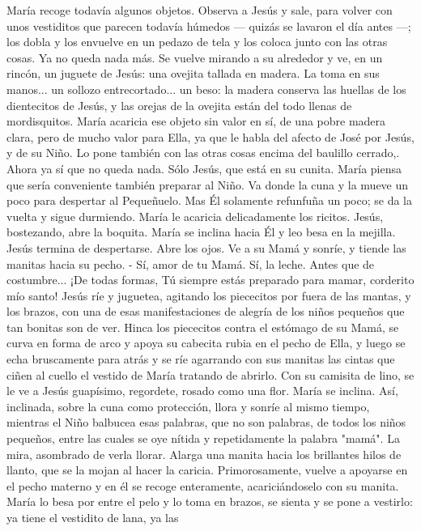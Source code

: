 \documentclass[12pt]{book} %
\begin{document}
María recoge todavía algunos objetos. Observa a Jesús y sale, para volver con unos vestiditos que parecen todavía 
húmedos — quizás se lavaron el día antes —; los dobla y los envuelve en un pedazo de tela y los coloca junto con las otras cosas. Ya no queda nada más. 
Se vuelve mirando a su alrededor y ve, en un rincón, un juguete de Jesús: una ovejita tallada en madera. La toma en sus 
manos... un sollozo entrecortado... un beso: la madera conserva las huellas de los dientecitos de Jesús, y las orejas de la ovejita están del todo llenas de mordisquitos. María acaricia ese objeto sin valor en sí, de una pobre madera clara, pero de mucho valor para Ella, ya que le habla del afecto de José por Jesús, y de su Niño. Lo pone también con las otras cosas encima del baulillo cerrado,.               
Ahora ya sí que no queda nada. Sólo Jesús, que está en su cunita. María piensa que sería conveniente también preparar 
al Niño. Va donde la cuna y la mueve un poco para despertar al Pequeñuelo. Mas Él solamente refunfuña un poco; se da la vuelta y sigue durmiendo. María le acaricia delicadamente los ricitos. Jesús, bostezando, abre la boquita. María se inclina hacia Él y leo besa en la mejilla. Jesús termina de despertarse. Abre los ojos. Ve a su Mamá y sonríe, y tiende las manitas hacia su pecho. 
- Sí, amor de tu Mamá. Sí, la leche. Antes que de costumbre... ¡De todas formas, Tú siempre estás preparado para 
mamar, corderito mío santo! 
Jesús ríe y juguetea, agitando los piececitos por fuera de las mantas, y los brazos, con una de esas manifestaciones de 
alegría de los niños pequeños que tan bonitas son de ver. Hinca los piececitos contra el estómago de su Mamá, se curva en forma de arco y apoya su cabecita rubia en el pecho de Ella, y luego se echa bruscamente para atrás y se ríe agarrando con sus manitas las cintas que ciñen al cuello el vestido de María tratando de abrirlo. Con su camisita de lino, se le ve a Jesús guapísimo, regordete, rosado como una flor. 
María se inclina. Así, inclinada, sobre la cuna como protección, llora y sonríe al mismo tiempo, mientras el Niño 
balbucea esas palabras, que no son palabras, de todos los niños pequeños, entre las cuales se oye nítida y repetidamente la palabra "mamá". La mira, asombrado de verla llorar. Alarga una manita hacia los brillantes hilos de llanto, que se la mojan al hacer la caricia. Primorosamente, vuelve a apoyarse en el pecho materno y en él se recoge enteramente, acariciándoselo con su manita. 
María lo besa por entre el pelo y lo toma en brazos, se sienta y se pone a vestirlo: ya tiene el vestidito de lana, ya las 
\end{document}

